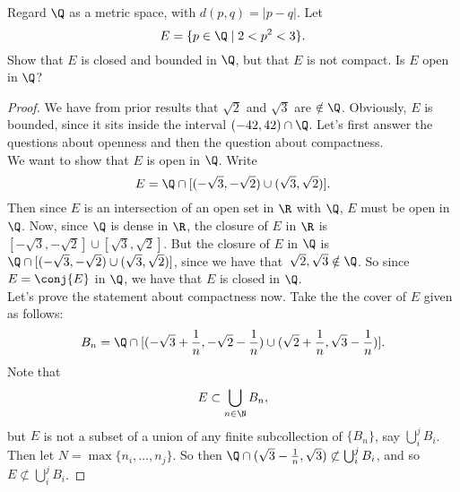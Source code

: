 \documentclass{assignment}
\begin{document}
\begin{question}[2.16]
  Regard $\Q$ as a metric space, with $d(p,q) = |p - q|$. Let $$ E = \{p\in\Q\mid 2 < p^2 < 3\}.$$
Show that $E$ is closed and bounded in $\Q$, but that $E$ is not compact. Is $E$ open in $\Q$?
\end{question}
\begin{proof}
  We have from prior results that $\sqrt{2}$ and $\sqrt{3}$ are $\notin\Q$. Obviously, $E$ is bounded,
  since it sits inside the interval $(-42, 42)\cap\Q$. Let's first answer the questions about openness
  and then the question about compactness. \\

  We want to show that $E$ is open in $\Q$. Write 
  $$E = \Q \cap [(-\sqrt{3}, -\sqrt{2}) \cup (\sqrt{3}, \sqrt{2})].$$ Then since $E$ is an intersection
  of an open set in $\R$ with $\Q$, $E$ must be open in $\Q$. Now, since $\Q$ is dense in $\R$, the 
  closure of $E$ in $\R$ is $[-\sqrt{3}, -\sqrt{2}] \cup [\sqrt{3}, \sqrt{2}]$. But the closure of 
  $E$ in $\Q$ is $\Q \cap [(-\sqrt{3}, -\sqrt{2}) \cup (\sqrt{3}, \sqrt{2})]$, since we have that\
  $\sqrt{2}, \sqrt{3} \notin \Q$. So since $E = \conj{E}$ in $\Q$, we have that $E$ is closed in $\Q$. \\

  Let's prove the statement about compactness now. Take the the cover of $E$ given as follows:
  $$B_n = \Q \cap [(-\sqrt{3} + \frac{1}{n}, -\sqrt{2} - \frac{1}{n}) \cup (\sqrt{2} + \frac{1}{n}, \sqrt{3} - \frac{1}{n})].$$
  Note that $$E\subset\bigcup_{n\in\N}B_n,$$ but $E$ is not a subset of a union of any finite 
  subcollection of $\{B_n\}$, say $\bigcup_i^j B_i$. Then let $N = \max\{n_i,\ldots,n_j\}$. So then
  $\Q\cap (\sqrt{3} - \frac{1}{n}, \sqrt{3}) \not\subset \bigcup_i^j B_i$, and so $E\not\subset\bigcup_i^j B_i$.
\end{proof}
\end{document}
